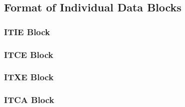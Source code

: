 \subsection{Format of Individual Data Blocks}
\subsubsection{\textsf{ITIE} Block}\label{sec:ITIEBlock}

\subsubsection{\textsf{ITCE} Block}\label{sec:ITCEBlock}

\subsubsection{\textsf{ITXE} Block}\label{sec:ITXEBlock}

\subsubsection{\textsf{ITCA} Block}\label{sec:ITCABlock}
